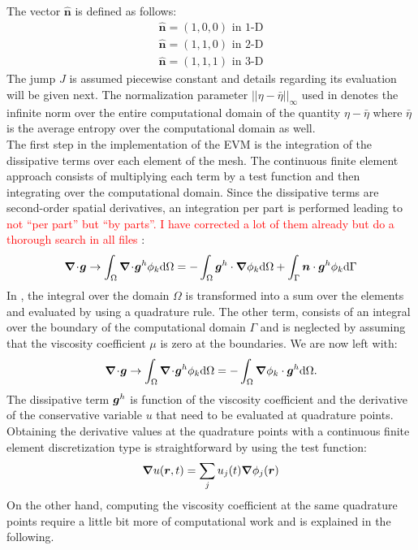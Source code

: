 %
The vector $\boldsymbol{\hat{n}}$ is defined as follows:
\begin{eqnarray}\label{eq:bg_hat_sect2}
\boldsymbol{\hat{n}} = \left( 1, 0, 0 \right) \text{ in 1-D} \nonumber \\
\boldsymbol{\hat{n}} = \left( 1, 1, 0 \right) \text{ in 2-D} \nonumber \\
\boldsymbol{\hat{n}} = \left( 1, 1, 1 \right) \text{ in 3-D} \nonumber
\end{eqnarray}
The jump $J$ is assumed piecewise constant and details regarding its evaluation will be given next. The normalization parameter $|| \eta - \bar{\eta} ||_\infty$ used in  denotes the infinite norm over the entire computational domain of the quantity $\eta - \bar{\eta}$ where $\bar{\eta}$ is the average entropy over the computational domain as well.\\
The first step in the implementation of the EVM is the integration of the dissipative terms over each element of the mesh. The continuous finite element approach consists of multiplying each term by a test function and then integrating over the computational domain. Since the dissipative terms are second-order spatial derivatives, an integration per part is performed leading to \textcolor{red}{not ``per part'' but ``by parts''. I have corrected a lot of them already but do a thorough search in all files} :
%
\begin{equation}\label{eq:diss_term_sct2}
\boldsymbol{\nabla}\! \cdot \! \boldsymbol g \rightarrow \int_\Omega \boldsymbol{\nabla}\! \cdot \! \boldsymbol g^h \phi_k \text{d}\Omega  = -\int_\Omega \boldsymbol g^h \cdot \boldsymbol{\nabla} \phi_k \text{d}\Omega + \int_\Gamma \boldsymbol n \cdot \boldsymbol g^h \phi_k \text{d}\Gamma
\end{equation} 
%
In , the integral over the domain $\Omega$ is transformed into a sum over the elements and evaluated by using a quadrature rule. The other term, consists of an integral over the boundary of the computational domain $\Gamma$ and is neglected by assuming that the viscosity coefficient $\mu$ is zero at the boundaries. We are now left with:
\begin{equation}\label{eq:diss_term2_sct2}
\boldsymbol{\nabla}\! \cdot \! \boldsymbol g \rightarrow \int_\Omega \boldsymbol{\nabla}\! \cdot \! \boldsymbol g^h \phi_k \text{d}\Omega  = -\int_\Omega \boldsymbol{\nabla} \phi_k \cdot \boldsymbol g^h\text{d}\Omega.
\end{equation} 
%
The dissipative term $\boldsymbol g^h$ is function of the viscosity coefficient and the derivative of the conservative variable $u$ that need to be evaluated at quadrature points. Obtaining the derivative values at the quadrature points with a continuous finite element discretization type is straightforward by using the test function: 
%
\begin{equation}
\boldsymbol{\nabla} u(\boldsymbol r,t) = \sum_j u_j(t) \boldsymbol{\nabla} \phi_j(\boldsymbol r)
\end{equation}
%
On the other hand, computing the viscosity coefficient at the same quadrature points require a little bit more of computational work and is explained in the following. \\

